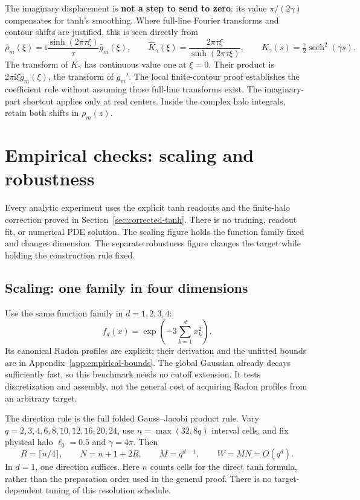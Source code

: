 \documentclass[11pt,letterpaper]{article}
\newcommand{\ii}{\mathrm i}
\theoremstyle{definition}
\theoremstyle{remark}
\begin{document}
The imaginary displacement is \textbf{not a step to send to zero}: its value
\(\pi/(2\gamma)\) compensates for tanh's smoothing. Where full-line Fourier
transforms and contour shifts are justified, this is seen directly from
\[
 \widehat\rho_m(\xi)=\ii\frac{\sinh(2\pi\tau\xi)}{\tau}\widehat g_m(\xi),
 \qquad
 \widehat K_\gamma(\xi)=\frac{2\pi\tau\xi}{\sinh(2\pi\tau\xi)},
 \qquad K_\gamma(s)=\tfrac\gamma2\operatorname{sech}^2(\gamma s).
\]
The transform of \(K_\gamma\) has continuous value one at \(\xi=0\).
Their product is \(2\pi\ii\xi\widehat g_m(\xi)\), the transform of \(g_m'\).
The local finite-contour proof establishes the coefficient rule without
assuming those full-line transforms exist.
The imaginary-part shortcut applies only at real centers. Inside the complex
halo integrals, retain both shifts in \(\rho_m(z)\).

\section{Empirical checks: scaling and robustness}\label{sec:empirical}
Every analytic experiment uses the explicit tanh readouts and the finite-halo
correction proved in Section~\ref{sec:corrected-tanh}. There is no training,
readout fit, or numerical PDE solution. The scaling figure holds the function
family fixed and changes dimension. The separate robustness figure changes
the target while holding the construction rule fixed.

\subsection{Scaling: one family in four dimensions}
Use the same function family in \(d=1,2,3,4\):
\[
 f_d(x)=\exp\!\left(-3\sum_{k=1}^d x_k^2\right).
\]
Its canonical Radon profiles are explicit; their derivation and the unfitted
bounds are in Appendix~\ref{app:empirical-bounds}. The global Gaussian
already decays sufficiently fast, so this benchmark needs no cutoff extension.
It tests discretization and assembly, not the general cost of acquiring Radon
profiles from an arbitrary target.

The direction rule is the full folded Gauss--Jacobi product rule. Vary
\(q=2,3,4,6,8,10,12,16,20,24\), use \(n=\max(32,8q)\) interval cells,
and fix physical halo \(\ell_0=0.5\) and \(\gamma=4\pi\). Then
\[
 R=\lceil n/4\rceil,\qquad N=n+1+2R,\qquad M=q^{d-1},\qquad W=MN=O(q^d).
\]
In \(d=1\), one direction suffices. Here \(n\) counts cells for the direct
tanh formula, rather than the preparation order used in the general proof.
There is no target-dependent tuning of this resolution schedule.
\end{document}
